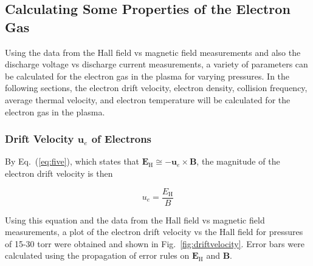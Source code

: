 \documentclass[%
 aip,
rsi,%
 amsmath,amssymb,
 reprint,%
author-numerical,%
]{revtex4-1}
\begin{document}
\subsection{Calculating Some Properties of the Electron Gas}
Using the data from the Hall field vs magnetic field measurements and also the discharge voltage vs discharge current measurements, a variety of parameters can be calculated for the electron gas in the plasma for varying pressures. In the following sections, the electron drift velocity, electron density, collision frequency, average thermal velocity, and electron temperature will be calculated for the electron gas in the plasma.

\subsubsection{Drift Velocity $\boldsymbol { u } _ { e }$ of Electrons}
By Eq.~(\ref{eq:five}), which states that $\boldsymbol { E } _ { \mathrm { H } } \cong - \boldsymbol { u } _ { e } \times \boldsymbol { B }$, the magnitude of the electron drift velocity is then 


\begin{equation}
u _ { e } = \frac {{ E } _ { \mathrm { H } } } { B }
\label{eq:eight}
\end{equation}

Using this equation and the data from the Hall field vs magnetic field measurements, a plot of the electron drift velocity vs the Hall field for pressures of 15-30 torr were obtained and shown in Fig.~\ref{fig:driftvelocity}. Error bars were calculated using the propagation of error rules on $\boldsymbol { E } _ { \mathrm { H } }$ and $\boldsymbol { B }$. 
\end{document}
